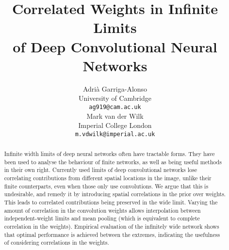 \documentclass{article}
\title{Correlated Weights in Infinite Limits \\ of Deep Convolutional Neural Networks}
\author{%
  Adrià Garriga-Alonso \\
  University of Cambridge \\
  \texttt{ag919@cam.ac.uk} \\
   \And
   Mark van der Wilk \\
   Imperial College London \\
   \texttt{m.vdwilk@imperial.ac.uk} \\
}
\begin{document}
\maketitle

\begin{abstract}
Infinite width limits of deep neural networks often have tractable forms. They have been used to analyse the behaviour of finite networks, as well as being useful methods in their own right. Currently used limits of deep convolutional networks lose correlating contributions from different spatial locations in the image, unlike their finite counterparts, even when those only use convolutions. We argue that this is undesirable, and remedy it by introducing spatial correlations in the prior over weights. This leads to correlated contributions being preserved in the wide limit. Varying the amount of correlation in the convolution weights allows interpolation between independent-weight limits and mean pooling (which is equivalent to complete correlation in the weights). Empirical evaluation of the infinitely wide network shows that optimal performance is achieved between the extremes, indicating the usefulness of considering correlations in the weights.
\end{abstract}

\end{document}
